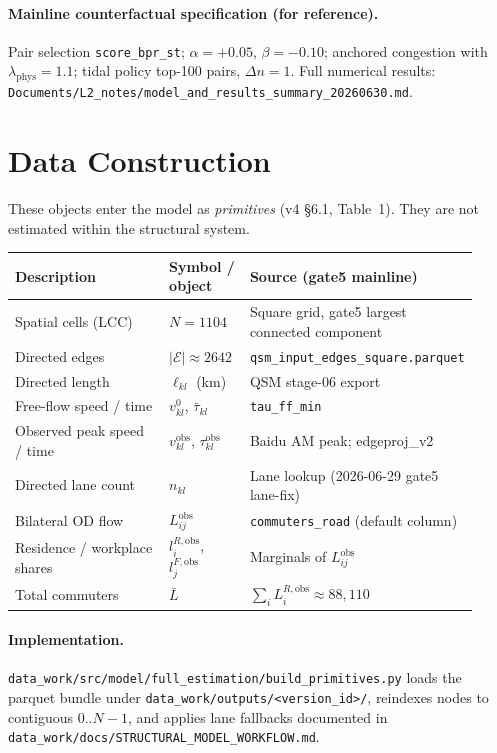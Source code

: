 \documentclass[11pt]{article}
\newcommand{\Lbar}{\bar L}
\newcommand{\obs}{\mathrm{obs}}
\newcommand{\phys}{\mathrm{phys}}
\begin{document}
\paragraph{Mainline counterfactual specification (for reference).}
Pair selection \texttt{score\_bpr\_st}; $\alpha=+0.05$, $\beta=-0.10$;
anchored congestion with $\lambda_{\phys}=1.1$; tidal policy top-100
pairs, $\Delta n=1$.  Full numerical results:
\texttt{Documents/L2\_notes/model\_and\_results\_summary\_20260630.md}.

\section{Data Construction}\label{sec:data}

These objects enter the model as \emph{primitives} (v4 \S6.1, Table~1).
They are not estimated within the structural system.

\begin{longtable}{@{}p{0.42\linewidth}p{0.18\linewidth}p{0.32\linewidth}@{}}
\toprule
\textbf{Description} & \textbf{Symbol / object} & \textbf{Source (gate5 mainline)} \\
\midrule
\endhead
Spatial cells (LCC) & $N=1104$ & Square grid, gate5 largest connected component \\
Directed edges & $|\mathcal{E}|\approx 2642$ & \texttt{qsm\_input\_edges\_square.parquet} \\
Directed length & $\ell_{kl}$ (km) & QSM stage-06 export \\
Free-flow speed / time & $v^0_{kl}$, $\bar\tau_{kl}$ & \texttt{tau\_ff\_min} \\
Observed peak speed / time & $v^{\obs}_{kl}$, $\tau^{\obs}_{kl}$ & Baidu AM peak; edgeproj\_v2 \\
Directed lane count & $n_{kl}$ & Lane lookup (2026-06-29 gate5 lane-fix) \\
Bilateral OD flow & $L^{\obs}_{ij}$ & \texttt{commuters\_road} (default column) \\
Residence / workplace shares & $l^{R,\obs}_i$, $l^{F,\obs}_j$ & Marginals of $L^{\obs}_{ij}$ \\
Total commuters & $\Lbar$ & $\sum_i L^{R,\obs}_i \approx 88{,}110$ \\
\bottomrule
\end{longtable}

\paragraph{Implementation.}
\texttt{data\_work/src/model/full\_estimation/build\_primitives.py}
loads the parquet bundle under
\texttt{data\_work/outputs/<version\_id>/}, reindexes nodes to
contiguous $0..N-1$, and applies lane fallbacks documented in
\texttt{data\_work/docs/STRUCTURAL\_MODEL\_WORKFLOW.md}.
\end{document}
